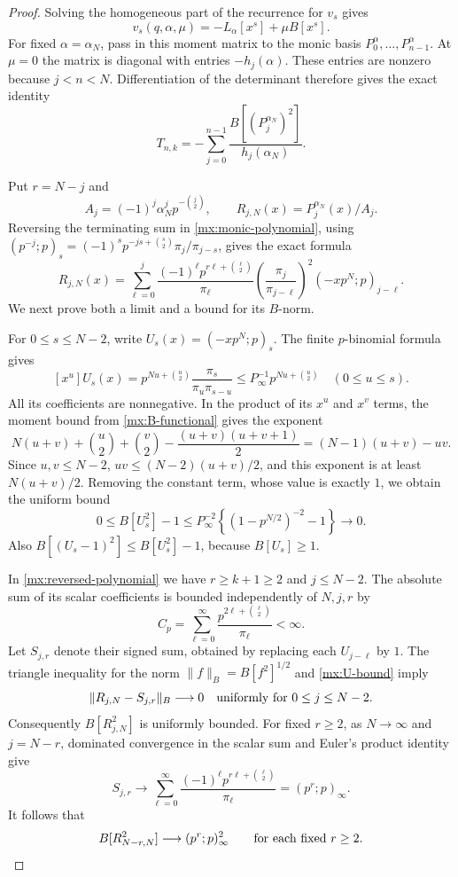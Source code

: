 \documentclass[11pt]{article}
\numberwithin{equation}{section}
\theoremstyle{definition}
\theoremstyle{remark}
\begin{document}
\begin{proof}
Solving the homogeneous part of the recurrence for $v_s$ gives
\[
 v_s(q,\alpha,\mu)=-L_\alpha[x^s]+\mu B[x^s].
\]
For fixed $\alpha=\alpha_N$, pass in this moment matrix to the monic
basis $P_0^\alpha,\ldots,P_{n-1}^\alpha$.
At $\mu=0$ the matrix is diagonal with entries $-h_j(\alpha)$.
These entries are nonzero because $j<n<N$.
Differentiation of the determinant therefore gives the exact identity
\begin{equation}\label{mx:trace-formula}
 T_{n,k}=-\sum_{j=0}^{n-1}
 \frac{B[(P_j^{\alpha_N})^2]}{h_j(\alpha_N)}.
\end{equation}

Put $r=N-j$ and
\[
 A_j=(-1)^j\alpha_N^jp^{-\binom j2},\qquad
 R_{j,N}(x)=P_j^{\alpha_N}(x)/A_j.
\]
Reversing the terminating sum in \eqref{mx:monic-polynomial}, using
$(p^{-j};p)_s=(-1)^sp^{-js+\binom s2}\pi_j/\pi_{j-s}$,
gives the exact formula
\begin{equation}\label{mx:reversed-polynomial}
 R_{j,N}(x)=
 \sum_{\ell=0}^{j}
 \frac{(-1)^\ell p^{r\ell+\binom\ell2}}{\pi_\ell}
 \left(\frac{\pi_j}{\pi_{j-\ell}}\right)^2
 (-xp^N;p)_{j-\ell}.
\end{equation}
We next prove both a limit and a bound for its $B$-norm.

For $0\le s\le N-2$, write $U_s(x)=(-xp^N;p)_s$.
The finite $p$-binomial formula gives
\[
 [x^u]U_s(x)
 =p^{Nu+\binom u2}\frac{\pi_s}{\pi_u\pi_{s-u}}
 \le P_\infty^{-1}p^{Nu+\binom u2}
 \quad(0\le u\le s).
\]
All its coefficients are nonnegative.  In the product of its
$x^u$ and $x^v$ terms, the moment bound from
\eqref{mx:B-functional} gives the exponent
\[
 N(u+v)+\binom u2+\binom v2
 -\frac{(u+v)(u+v+1)}2
 =(N-1)(u+v)-uv.
\]
Since $u,v\le N-2$,
$uv\le (N-2)(u+v)/2$, and this exponent is at least
$N(u+v)/2$.  Removing the constant term, whose value is exactly $1$,
we obtain the uniform bound
\begin{equation}\label{mx:U-bound}
 0\le B[U_s^2]-1
 \le P_\infty^{-2}
 \left\{(1-p^{N/2})^{-2}-1\right\}
 \longrightarrow0.
\end{equation}
Also $B[(U_s-1)^2]\le B[U_s^2]-1$, because
$B[U_s]\ge1$.

In \eqref{mx:reversed-polynomial} we have
$r\ge k+1\ge2$ and $j\le N-2$.
The absolute sum of its scalar coefficients is bounded independently
of $N,j,r$ by
\[
 C_p=\sum_{\ell=0}^{\infty}
 \frac{p^{2\ell+\binom\ell2}}{\pi_\ell}<\infty.
\]
Let $S_{j,r}$ denote their signed sum, obtained by replacing each
$U_{j-\ell}$ by $1$.
The triangle inequality for the norm
$\|f\|_B=B[f^2]^{1/2}$ and \eqref{mx:U-bound} imply
\[
 \|R_{j,N}-S_{j,r}\|_B\longrightarrow0
 \quad\hbox{uniformly for }0\le j\le N-2.
\]
Consequently $B[R_{j,N}^2]$ is uniformly bounded.
For fixed $r\ge2$, as $N\to\infty$ and $j=N-r$,
dominated convergence in the scalar sum and Euler's product identity
give
\[
 S_{j,r}\longrightarrow
 \sum_{\ell=0}^{\infty}
 \frac{(-1)^\ell p^{r\ell+\binom\ell2}}{\pi_\ell}
 =(p^r;p)_\infty.
\]
It follows that
\begin{equation}\label{mx:B-norm-limit}
 B[R_{N-r,N}^2]\longrightarrow(p^r;p)_\infty^2
 \qquad\hbox{for each fixed }r\ge2.
\end{equation}


\end{proof}
\end{document}
